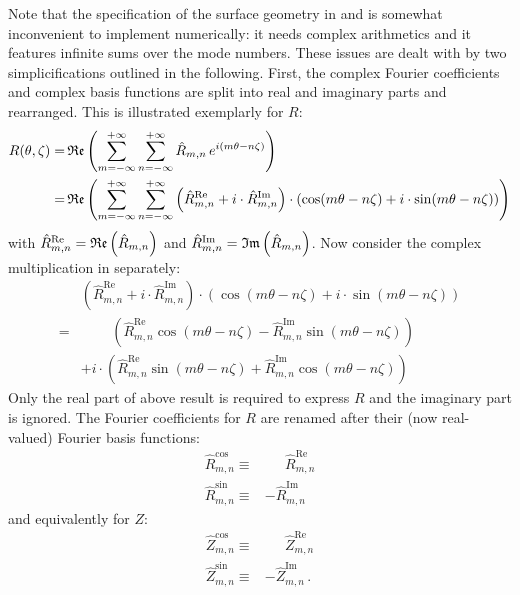 Note that the specification of the surface geometry in  and  is somewhat inconvenient to implement numerically:
it needs complex arithmetics and it features infinite sums over the mode numbers.
These issues are dealt with by two simplicifications outlined in the following.
First, the complex Fourier coefficients and complex basis functions are split into real and imaginary parts and rearranged.
This is illustrated exemplarly for $R$:
\begin{align}
  R(\theta, \zeta) =&\, \mathfrak{Re} \left( \sum_{m=-\infty}^{+\infty} \sum_{n=-\infty}^{+\infty}
                       \hat{R}_{m,n} \,e^{ i (m   \theta  - n \zeta)} \right)        \nonumber                 \\
                   =&\, \mathfrak{Re} \left( \sum_{m=-\infty}^{+\infty} \sum_{n=-\infty}^{+\infty}
                       \left( \hat{R}_{m,n}^\mathrm{Re} + i \cdot \hat{R}_{m,n}^\mathrm{Im} \right) \cdot
                       \left(  \cos(m \theta  - n \zeta) + i \cdot  \sin(m \theta  - n \zeta) \right) \right) \label{eqn:cplxR}
\end{align}
with $\hat{R}_{m,n}^\mathrm{Re} = \mathfrak{Re} \left( \hat{R}_{m,n} \right)$
and  $\hat{R}_{m,n}^\mathrm{Im} = \mathfrak{Im} \left( \hat{R}_{m,n} \right)$.
Now consider the complex multiplication in  separately:
\begin{align}
  ~& \left( \hat{R}_{m,n}^\mathrm{Re} + i \cdot \hat{R}_{m,n}^\mathrm{Im} \right) \cdot
     \left(  \cos(m \theta  - n \zeta) + i \cdot  \sin(m \theta  - n \zeta) \right) \nonumber \\
  =& \phantom{+ i \cdot}~~ \left( \hat{R}_{m,n}^\mathrm{Re} \cos(m \theta - n \zeta) - \hat{R}_{m,n}^\mathrm{Im} \sin(m \theta - n \zeta) \right) \nonumber \\
  ~&          + i \cdot    \left( \hat{R}_{m,n}^\mathrm{Re} \sin(m \theta - n \zeta) + \hat{R}_{m,n}^\mathrm{Im} \cos(m \theta - n \zeta) \right)
\end{align}
Only the real part of above result is required to express $R$ and the imaginary part is ignored.
The Fourier coefficients for $R$ are renamed after their (now real-valued) Fourier basis functions:
\begin{align}
  \hat{R}_{m,n}^\mathrm{cos} \equiv& \phantom{-}~ \hat{R}_{m,n}^\mathrm{Re} \\
  \hat{R}_{m,n}^\mathrm{sin} \equiv&          -   \hat{R}_{m,n}^\mathrm{Im}
\end{align}
and equivalently for $Z$:
\begin{align}
  \hat{Z}_{m,n}^\mathrm{cos} \equiv& \phantom{-}~ \hat{Z}_{m,n}^\mathrm{Re} \\
  \hat{Z}_{m,n}^\mathrm{sin} \equiv&          -   \hat{Z}_{m,n}^\mathrm{Im} \, .
\end{align}
